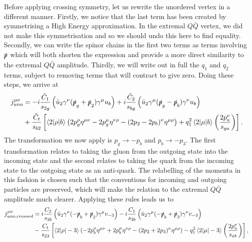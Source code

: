 Before applying crossing symmetry, let us rewrite the unordered vertex in a different manner. Firstly, we notice that the last term has been created by symmetrising a High Energy approximation. In the extremal $Q\bar{Q}$ vertex, we did not make this symmetrisation and so we should undo this here to find equality. Secondly, we can write the spinor chains in the first two terms as terms involving $\slashed{p}$ which will both shorten the expression and provide a more direct similarity to the extremal $Q\bar{Q}$ amplitude. Thirdly, we will write out in full the $q_1$ and $q_2$ terms, subject to removing terms that will contract to give zero. Doing these steps, we arrive at
\begin{equation}
\begin{split}
j_{uno}^{\mu \nu} &= -i \frac{\tilde{C}_1}{s_{2g}} \left(\bar{u}_2 \gamma^\nu (\slashed{p}_g + \slashed{p}_2) \gamma^\mu u_b \right) + i \frac{\tilde{C}_2}{s_{bg}} \left(\bar{u}_2 \gamma^\mu (\slashed{p}_g - \slashed{p}_b)\gamma^\nu u_b \right) \\
&+ \frac{\tilde{C}_t}{s_{b2}} \left[\mathinner{\langle2\vert\rho\vert b\rangle}_{} \left(2p_g^\rho \eta^{\mu \nu} - 2 p_g^\mu \eta^{\nu \rho} - (2p_2 - 2p_b)^\nu \eta^{\mu \rho} \right) + q_1^2 \mathinner{\langle2\vert\mu\vert b\rangle}_{} \left(\frac{2p_a^\nu}{s_{ga}} \right) \right].
\end{split}
\end{equation}
The transformation we now apply is $p_g \to -p_b$ and $p_b \to -p_3$. The first transformation relates to taking the gluon from the outgoing state into the incoming state and the second relates to taking the quark from the incoming state to the outgoing state as an anti-quark. The relabelling of the momenta in this fashion is chosen such that the conventions for incoming and outgoing particles are preserved, which will make the relation to the extremal $Q\bar{Q}$ amplitude much clearer. Applying these rules leads us to
\begin{equation}
\begin{split}
j_{uno, crossed}^{\mu \nu} &= i \frac{C_2}{s_{2b}} \left(\bar{u}_2 \gamma^\nu (-\slashed{p}_b + \slashed{p}_2) \gamma^\mu v_{-3} \right) - i \frac{C_1}{s_{3b}} \left(\bar{u}_2 \gamma^\mu (-\slashed{p}_b + \slashed{p}_3)\gamma^\nu v_{-3} \right) \\
&- \frac{C_t}{s_{23}} \left[\mathinner{\langle2\vert\rho\vert-3\rangle}_{} \left(-2p_b^\rho \eta^{\mu \nu} + 2 p_b^\mu \eta^{\nu \rho} - (2p_2 + 2p_3)^\nu \eta^{\mu \rho} \right) - q_1^2 \mathinner{\langle2\vert\mu\vert-3\rangle}_{} \left(\frac{2p_a^\nu}{s_{ab}} \right) \right],
\end{split}
\end{equation}
